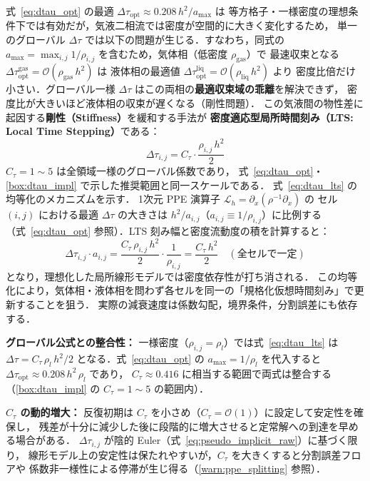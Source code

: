 式~\eqref{eq:dtau_opt} の最適 $\Delta\tau_\mathrm{opt} \approx 0.208\,h^2/a_\mathrm{max}$ は
等方格子・一様密度の理想条件下では有効だが，気液二相流では密度が空間的に大きく変化するため，
単一のグローバル $\Delta\tau$ では以下の問題が生じる．すなわち，同式の
$a_\mathrm{max} = \max_{i,j} 1/\rho_{i,j}$ を含むため，気体相（低密度 $\rho_\mathrm{gas}$）で
最速収束となる $\Delta\tau_\mathrm{opt}^\mathrm{gas} = \mathcal{O}(\rho_\mathrm{gas}\,h^2)$ は
液体相の最適値 $\Delta\tau_\mathrm{opt}^\mathrm{liq} = \mathcal{O}(\rho_\mathrm{liq}\,h^2)$ より
密度比倍だけ小さい．グローバル一様 $\Delta\tau$ はこの両相の\textbf{最適収束域の乖離}を解決できず，
密度比が大きいほど液体相の収束が遅くなる（剛性問題）．
この気液間の物性差に起因する\textbf{剛性（Stiffness）}を緩和する手法が
\textbf{密度適応型局所時間刻み（LTS: Local Time Stepping）}である：
\begin{equation}
  \Delta\tau_{i,j} = C_\tau \cdot \frac{\rho_{i,j}\,h^2}{2}
  \label{eq:dtau_lts}
\end{equation}
$C_\tau = 1 \sim 5$ は全領域一様のグローバル係数であり，
式~\eqref{eq:dtau_opt}・\ref{box:dtau_impl} で示した推奨範囲と同一スケールである．
式~\eqref{eq:dtau_lts} の均等化のメカニズムを示す．
1次元 PPE 演算子 $\mathcal{L}_h = \partial_x(\rho^{-1}\partial_x)$ の
セル $(i,j)$ における最適 $\Delta\tau$ の大きさは $h^2/a_{i,j}$（$a_{i,j} \equiv 1/\rho_{i,j}$）に比例する
（式~\eqref{eq:dtau_opt} 参照）．LTS 刻み幅と密度流動度の積を計算すると：
\begin{equation*}
  \Delta\tau_{i,j} \cdot a_{i,j}
  = \frac{C_\tau\,\rho_{i,j}\,h^2}{2} \cdot \frac{1}{\rho_{i,j}}
  = \frac{C_\tau\,h^2}{2} \quad (\text{全セルで一定})
\end{equation*}
となり，理想化した局所線形モデルでは密度依存性が打ち消される．
この均等化により，気体相・液体相を問わず各セルを同一の「規格化仮想時間刻み」で更新することを狙う．
実際の減衰速度は係数勾配，境界条件，分割誤差にも依存する．

\textbf{グローバル公式との整合性：}
一様密度（$\rho_{i,j} = \rho_l$）では式~\eqref{eq:dtau_lts} は
$\Delta\tau = C_\tau\,\rho_l\,h^2/2$ となる．式~\eqref{eq:dtau_opt} の $a_\mathrm{max} = 1/\rho_l$ を代入すると
$\Delta\tau_\mathrm{opt} \approx 0.208\,h^2\,\rho_l$ であり，
$C_\tau \approx 0.416$ に相当する範囲で両式は整合する（\ref{box:dtau_impl} の $C_\tau = 1 \sim 5$ の範囲内）．

\textbf{$C_\tau$ の動的増大：}
反復初期は $C_\tau$ を小さめ（$C_\tau = \mathcal{O}(1)$）に設定して安定性を確保し，
残差が十分に減少した後に段階的に増大させると定常解への到達を早める場合がある．
$\Delta\tau_{i,j}$ が陰的 Euler（式~\eqref{eq:pseudo_implicit_raw}）に基づく限り，
線形モデル上の安定性は保たれやすいが，$C_\tau$ を大きくすると分割誤差フロアや
係数非一様性による停滞が生じ得る（\ref{warn:ppe_splitting} 参照）．

